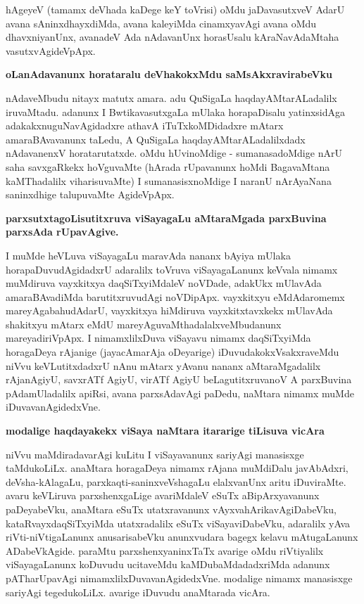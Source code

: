 hAgeyeV (tamamx deVhada kaDege keY toVrisi) oMdu jaDavasutxveV AdarU avana sAninxdhayxdiMda, avana kaleyiMda cinamxyavAgi avana oMdu dhavxniyanUnx, avanadeV Ada nAdavanUnx horasUsalu kAraNavAdaMtaha vasutxvAgideVpApx.

{\bigskip
\noindent
{\large\bf oLanAdavanunx horataralu deVhakokxMdu saMsAkxravirabeVku}}\label{page130}
\medskip

\noindent
nAdaveMbudu nitayx matutx amara. adu QuSigaLa haqdayAMtarALadalilx iruvaMtadu. adanunx I BwtikavasutxgaLa mUlaka horapaDisalu yatinxsidAga adakakxnuguNavAgidadxre athavA iTuTxkoMDidadxre mAtarx amaraBAvavanunx taLedu, A QuSigaLa haqdayAMtarALadalilxdadx nAdavanenxV horatarutatxde. oMdu hUvinoMdige - sumanasadoMdige nArU saha savxgaRkekx hoVguvaMte (hArada rUpavanunx hoMdi BagavaMtana kaMThadalilx viharisuvaMte) I sumanasisxnoMdige I naranU nArAyaNana saninxdhige talupuvaMte AgideVpApx.

\newpage

{\bigskip
\noindent
{\large\bf parxsutxtagoLisutitxruva viSayagaLu aMtaraMgada parxBuvina parxsAda rUpavAgive.}}
\medskip

\noindent
I muMde heVLuva viSayagaLu maravAda nananx bAyiya mUlaka horapaDuvudAgidadxrU adaralilx toVruva viSayagaLanunx keVvala nimamx muMdiruva \hbox{vayxkitxya} daqSiTxyiMdaleV noVDade, adakUkx mUlavAda amaraBAvadiMda barutitxruvudAgi noVDipApx. vayxkitxyu eMdAdaromemx mareyAgabahudAdarU, vayxkitxya hiMdiruva vayxkitxtavxkekx mUlavAda shakitxyu mAtarx eMdU mareyAguvaMthadalalxveMbudanunx mareyadiriVpApx. I nimamxlilxDuva viSayavu nimamx daqSiTxyiMda horagaDeya rAjanige (jayacAmarAja oDeyarige) iDuvudakokxVsakxraveMdu niVvu keVLutitxdadxrU nAnu mAtarx yAvanu nananx aMtaraMgadalilx rAjanAgiyU, savxrATf AgiyU, virATf AgiyU beLagutitxruvanoV A parxBuvina pAdamUladalilx apiRsi, avana parxsAdavAgi paDedu, naMtara nimamx muMde iDuvavanAgidedxVne.

{\bigskip
\noindent
{\large\bf modalige haqdayakekx viSaya naMtara itararige tiLisuva vicAra}}\label{page131}
\medskip

\noindent
niVvu maMdiradavarAgi kuLitu I viSayavanunx sariyAgi manasisxge taMdukoLiLx. anaMtara horagaDeya nimamx rAjana muMdiDalu javAbAdxri, deVsha-kAlagaLu, parxkaqti-saninxveVshagaLu elalxvanUnx aritu iDuviraMte. avaru keVLiruva parxshenxgaLige avariMdaleV eSuTx aBipArxyavanunx paDeyabeVku, anaMtara eSuTx utatxravanunx vAyxvahArikavAgiDabeVku, kataRvayxdaqSiTxyiMda utatxradalilx eSuTx viSayaviDabeVku, adaralilx yAva riVti-niVtigaLanunx anusarisabeVku anunxvudara bagegx kelavu mAtugaLanunx ADabeVkAgide. paraMtu parxshenxyaninxTaTx avarige oMdu riVtiyalilx viSayagaLanunx koDuvudu ucitaveMdu kaMDubaMdadadxriMda adanunx pATharUpavAgi nimamxlilxDuvavanAgidedxVne. modalige nimamx manasisxge sariyAgi tegedukoLiLx. avarige iDuvudu anaMtarada vicAra.

